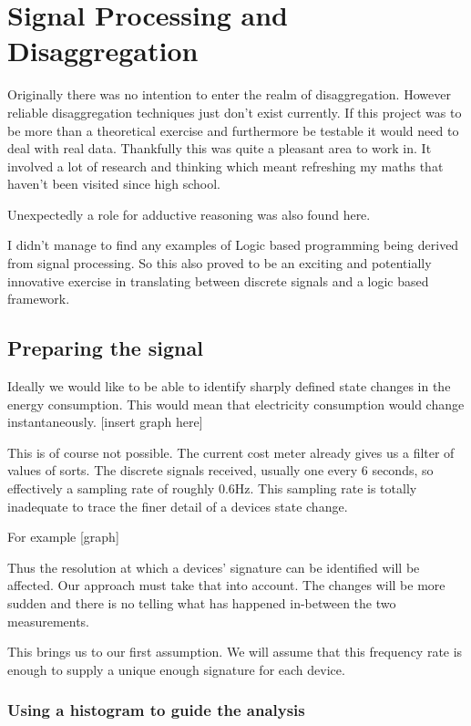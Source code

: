 \chapter{Signal Processing and Disaggregation}

Originally there was no intention to enter the realm of disaggregation. However reliable disaggregation techniques just don't exist currently. If this project was to be more than a theoretical exercise and furthermore be testable it would need to deal with real data. Thankfully this was quite a pleasant area to work in. It involved a lot of research and thinking which meant refreshing my maths that haven't been visited since high school.

Unexpectedly a role for adductive reasoning was also found here.

I didn't manage to find any examples of Logic based programming being derived from signal processing. So this also proved to be an exciting and potentially innovative exercise in translating between discrete signals and a logic based framework.


\section{Preparing the signal}

Ideally we would like to be able to identify sharply defined state changes in the energy consumption. This would mean that electricity consumption would change instantaneously. 
[insert graph here]

This is of course not possible. The current cost meter already gives us a filter of values of sorts. The discrete signals received, usually one every 6 seconds, so effectively a sampling rate of roughly 0.6Hz. This sampling rate is totally inadequate to trace the finer detail of a devices state change.

For example [graph]

Thus the resolution at which a devices' signature can be identified will be affected. Our approach must take that into account. The changes will be more sudden and there is no telling what has happened in-between the two measurements.

This brings us to our first assumption. We will assume that this frequency rate is enough to supply a unique enough signature for each device.

\subsection{Using a histogram to guide the analysis}

